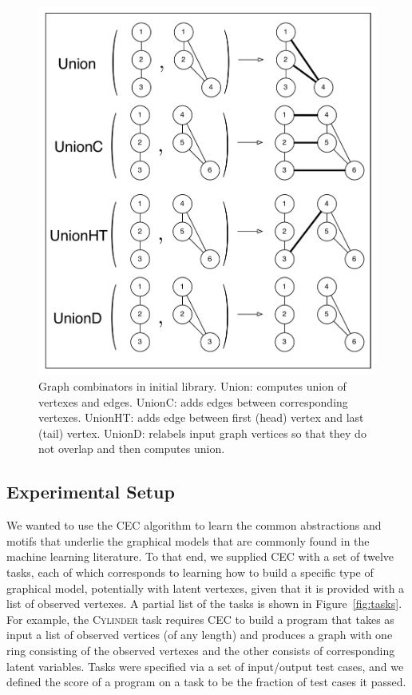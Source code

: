 \documentclass{article} %
\begin{document}
\begin{figure}[h]
\begin{minipage}[t]{.5\textwidth}
  \includegraphics[width=\linewidth]{./figures/GraphCombinators.pdf}
  \caption{Graph combinators in initial library. Union: computes union of vertexes and edges. UnionC: adds edges between corresponding vertexes. UnionHT: adds edge between first (head) vertex and last (tail) vertex. UnionD: relabels input graph vertices so that they do not overlap and then computes union.}
  \label{fig:graphcomb}\par\vfill
\end{minipage}
\vspace{-0.5cm}
\end{figure}

\subsection{Experimental Setup}

We wanted to use the CEC algorithm to learn the common abstractions and motifs that underlie the graphical models that are commonly found in the machine learning literature. To that end, we supplied CEC with a set of twelve tasks, each of which corresponds to learning how to build a specific type of graphical model, potentially with latent vertexes, given that it is provided with a list of observed vertexes. A partial list of the tasks is shown in Figure~\ref{fig:tasks}. For example, the \textsc{Cylinder} task requires CEC to build a program that takes as input a list of observed vertices (of any length) and produces a graph with one ring consisting of the observed vertexes and the other consists of corresponding latent variables. 
Tasks were specified via a set of input/output test cases, and we defined the score of a program on a task to be the fraction of test cases it passed. 
\end{document}
